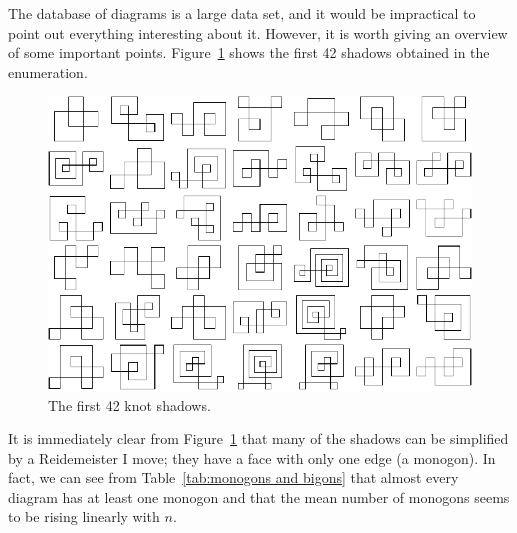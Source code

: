 \documentclass[amsmath,secnumarabic,floatfix,amssymb,nofootinbib,nobibnotes,letterpaper,11pt,tightenlines,showkeys]{revtex4}
\theoremstyle{definition}
\let\mgp=\marginpar \marginparwidth18mm \marginparsep1mm
\def\marginpar#1{\mgp{\raggedright\tiny #1}}
\let\lbl=\label
\def\label#1{\lbl{#1}\ifinner\else\marginpar{\ref{#1} #1}\ignorespaces\fi}
\begin{document}
The database of diagrams is a large data set, and it would be impractical to point out everything interesting about it. However, it is worth giving an overview of some important points. Figure~\ref{fig:knot grid} shows the first 42 shadows obtained in the enumeration.
\begin{figure}
\includegraphics[width=6in]{knotgrid.pdf}
\caption{The first 42 knot shadows.}
\label{fig:knot grid}
\end{figure}
It is immediately clear from Figure~\ref{fig:knot grid} that many of the shadows can be simplified by a Reidemeister I move; they have a face with only one edge (a monogon). In fact, we can see from Table~\ref{tab:monogons and bigons} that almost every diagram has at least one monogon and that the mean number of monogons seems to be rising linearly with $n$.  
\end{document}
